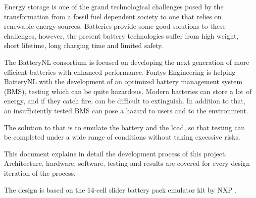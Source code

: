 \IEEEPARstart
{E}{nergy} storage is one of the grand technological challenges posed by the transformation from a
fossil fuel dependent society to one that relies on renewable energy sources. Batteries provide
some good solutions to these challenges, however, the present battery technologies suffer from
high weight, short lifetime, long charging time and limited safety.

The BatteryNL consortium is focused on developing the next generation of more efficient
batteries with enhanced performance. Fontys Engineering is helping BatteryNL with the development 
of an optimized battery management system (BMS), testing which can be quite
hazardous. Modern batteries can store a lot of energy, and if they catch fire, can be difficult to
extinguish. In addition to that, an insufficiently tested BMS can pose a hazard to users and to
the environment.

The solution to that is to emulate the battery and the load, so that testing can be completed
under a wide range of conditions without taking excessive risks.

This document explains in detail the development process of this project. 
Architecture, hardware, software, testing and results are covered for every design 
iteration of the process. 

The design is based on the 14-cell slider battery pack emulator kit by 
NXP \cite{UM11349}.